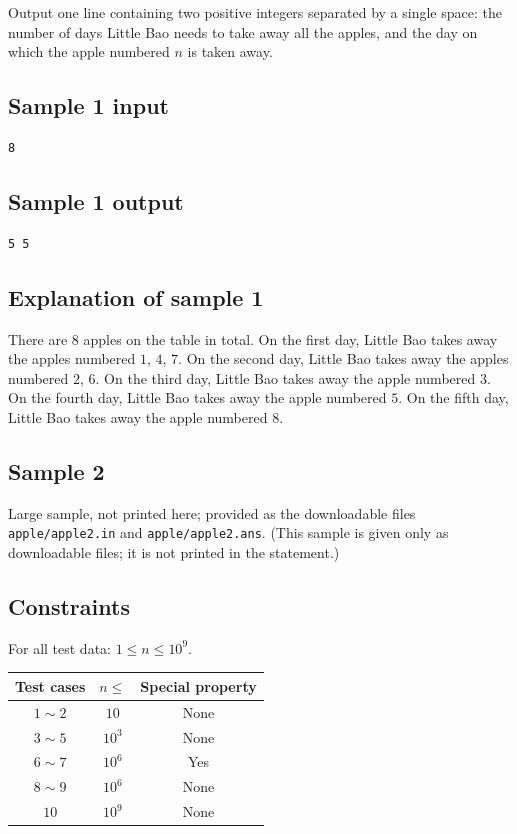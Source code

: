 \documentclass[11pt]{article}
\begin{document}
Output one line containing two positive integers separated by a single
space:
the number of days Little Bao needs to take away all the apples,
and the day on which the apple numbered $n$ is taken away.

\subsection*{Sample 1 input}

\begin{verbatim}
8
\end{verbatim}

\subsection*{Sample 1 output}

\begin{verbatim}
5 5
\end{verbatim}

\subsection*{Explanation of sample 1}

There are $8$ apples on the table in total.
On the first day, Little Bao takes away the apples numbered $1$, $4$, $7$.
On the second day, Little Bao takes away the apples numbered $2$, $6$.
On the third day, Little Bao takes away the apple numbered $3$.
On the fourth day, Little Bao takes away the apple numbered $5$.
On the fifth day, Little Bao takes away the apple numbered $8$.

\subsection*{Sample 2}

Large sample, not printed here;
provided as the downloadable files \texttt{apple/apple2.in} and \texttt{apple/apple2.ans}.
(This sample is given only as downloadable files; it is not printed in the
statement.)

\subsection*{Constraints}

For all test data: $1 \le n \le 10^9$.

\begin{center}
\begin{tabular}{ccc}
\toprule
Test cases & $n \le$ & Special property \\
\midrule
$1 \sim 2$ & $10$ & None \\
$3 \sim 5$ & $10^3$ & None \\
$6 \sim 7$ & $10^6$ & Yes \\
$8 \sim 9$ & $10^6$ & None \\
$10$ & $10^9$ & None \\
\bottomrule
\end{tabular}
\end{center}
\end{document}
